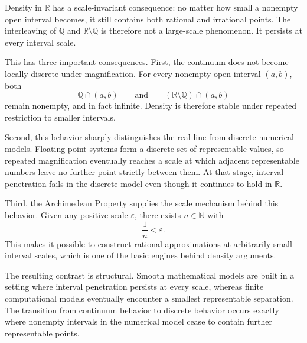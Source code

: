 


\begin{exposition}
Density in $\mathbb{R}$ has a scale-invariant consequence: no matter how small a nonempty
open interval becomes, it still contains both rational and irrational points. The interleaving
of $\mathbb{Q}$ and $\mathbb{R}\setminus\mathbb{Q}$ is therefore not a large-scale phenomenon.
It persists at every interval scale.

This has three important consequences. First, the continuum does not become locally discrete
under magnification. For every nonempty open interval $(a,b)$, both
\[
\mathbb{Q}\cap(a,b)
\qquad\text{and}\qquad
(\mathbb{R}\setminus\mathbb{Q})\cap(a,b)
\]
remain nonempty, and in fact infinite. Density is therefore stable under repeated restriction
to smaller intervals.

Second, this behavior sharply distinguishes the real line from discrete numerical models.
Floating-point systems form a discrete set of representable values, so repeated magnification
eventually reaches a scale at which adjacent representable numbers leave no further point
strictly between them. At that stage, interval penetration fails in the discrete model even
though it continues to hold in $\mathbb{R}$.

Third, the Archimedean Property supplies the scale mechanism behind this behavior. Given any
positive scale $\varepsilon$, there exists $n\in\mathbb{N}$ with
\[
\frac{1}{n}<\varepsilon.
\]
This makes it possible to construct rational approximations at arbitrarily small interval
scales, which is one of the basic engines behind density arguments.

The resulting contrast is structural. Smooth mathematical models are built in a setting where
interval penetration persists at every scale, whereas finite computational models eventually
encounter a smallest representable separation. The transition from continuum behavior to
discrete behavior occurs exactly where nonempty intervals in the numerical model cease to
contain further \\representable points.
\end{exposition}


